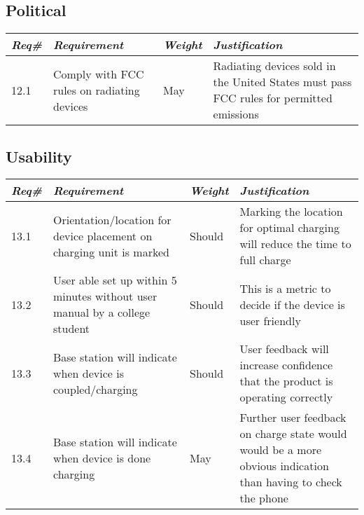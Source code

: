     \subsection{Political}
        \begin{centering}
        \begin{tabular}{|l|m{7cm}|l|m{7cm}|} \hline
        \textit{\textbf{Req\#}}	& \textit{\textbf{Requirement}} &\textit{\textbf{Weight}}&\textit{\textbf{Justification}} \\ \hline
        12.1 & Comply with FCC rules on radiating devices & May & Radiating devices sold in the United States must pass FCC rules for permitted emissions \\ \hline
        \end{tabular}
        \end{centering}
             
    \subsection{Usability }
        \begin{centering}
        \begin{tabular}{|l|m{7cm}|l|m{7cm}|}        \hline
        \textit{\textbf{Req\#}}	& \textit{\textbf{Requirement}} &\textit{\textbf{Weight}}&\textit{\textbf{Justification}} \\ \hline
        13.1 & Orientation/location for device placement on charging unit is marked & Should & Marking the location for optimal charging will reduce the time to full charge\\ \hline
        13.2 & User able set up within 5 minutes without user manual by a college student & Should & This is a metric to decide if the device is user friendly \\ \hline
        13.3 & Base station will indicate when device is coupled/charging & Should & User feedback will increase confidence that the product is operating correctly                                \\ \hline
        13.4 & Base station will indicate when device is done charging & May& Further user feedback on charge state would would be a more obvious indication than having to check the phone \\ \hline
        \end{tabular}
        \end{centering}
        
